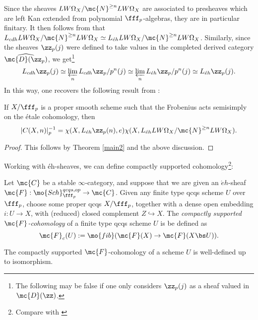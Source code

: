 Since the sheaves $LW\Omega_{X}/\mc{N}^{\geq n}LW\Omega_{X}$ are associated to presheaves which are left Kan extended from polynomial $\fff_p$-algebras, they are in particular finitary.  It then follows from \cite[Theorem~A.3]{elmanto2023motivic} that $L_{cdh}LW\Omega_{X}/\mc{N}^{\geq n}LW\Omega_{X}\simeq L_{\acute{e}h}LW\Omega_{X}/\mc{N}^{\geq n}LW\Omega_{X}$.  Similarly, since the sheaves $\zz_p(j)$ were defined to take values in the completed derived category $\widehat{\mc{D}(\zz_p)}$, we get\footnote{The following may be false if one only considers $\zz_p(j)$ as a sheaf valued in $\mc{D}(\zz)$.} $$L_{cdh}\zz_p(j)\simeq \varprojlim_{n}L_{cdh}\zz_p/p^n(j)\simeq \varprojlim_{n}L_{\acute{e}h}\zz_p/p^n(j)\simeq L_{\acute{e}h}\zz_p(j).$$  In this way, one recovers the following result from \cite{geisser2005arithmetic}:
\begin{corollary}\label{cor36}
If $X/\fff_p$ is a proper smooth scheme such that the Frobenius acts semisimply on the \'{e}tale cohomology, then $$|C(X,n)|_{p}^{-1}=\chi(X,L_{\acute{e}h}\zz_p(n),e)\chi(X,L_{\acute{e}h}LW\Omega_X/\mc{N}^{\geq n}LW\Omega_X).$$ 
\end{corollary}
\begin{proof}
This follows by Theorem \ref{main2} and the above discussion.
\end{proof}
Working with \'{e}h-sheaves, we can define compactly supported cohomology\footnote{Compare with \cite[Definition~3.3]{geisser2005arithmetic}}:
\begin{definition}
Let $\mc{C}$ be a stable $\infty$-category, and suppose that we are given an $\acute{e}h$-sheaf $\mc{F}:\mo{Sch}^{qcqs,op}_{\fff_p}\to \mc{C}$.  Given any finite type qcqs scheme $U$ over $\fff_p$, choose some proper qcqs $X/\fff_p$, together with a dense open embedding $i:U\to X$, with (reduced) closed complement $Z\hookrightarrow X$. The \textit{compactly supported $\mc{F}$-cohomology} of a finite type qcqs scheme $U$ is be defined as $$\mc{F}_{c}(U):=\mo{fib}(\mc{F}(X)\to\mc{F}(X\bs U)).$$
\end{definition}
\begin{proposition}
The compactly supported $\mc{F}$-cohomology of a scheme $U$ is well-defined up to isomorphism.
\end{proposition}
